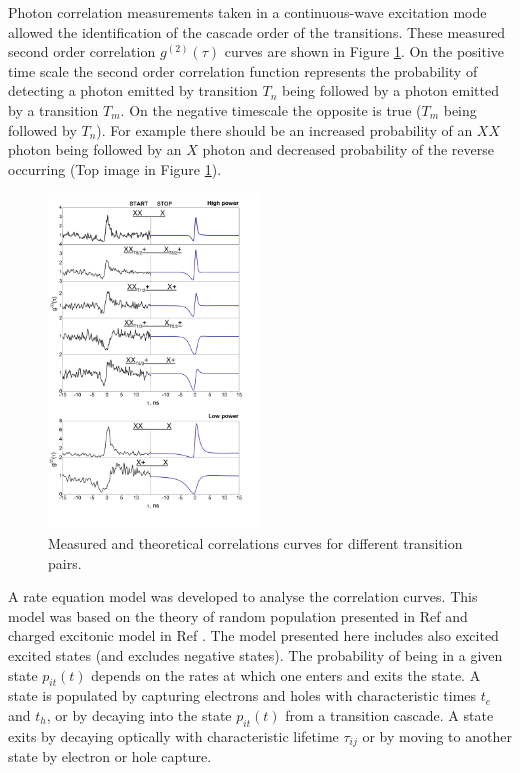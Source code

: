 \documentclass[12pt, twoside]{article}
\numberwithin{equation}{section}
\begin{document}
Photon correlation measurements taken in a continuous-wave excitation
mode allowed the identification of the cascade order of the transitions.
These measured second order correlation $g^{(2)}(\tau)$ curves are shown
in Figure \ref{fig:trioncorrs}. On the positive time scale the second
order correlation function represents the probability of detecting a
photon emitted by transition $T_n$ being followed by a photon emitted by
a transition $T_m$. On the negative timescale the opposite is true
($T_m$ being followed by $T_n$). For example there should be an
increased probability of an $XX$ photon being followed by an $X$ photon
and decreased probability of the reverse occurring (Top image in Figure
\ref{fig:trioncorrs}).

\begin{figure}[H]
    \centering
    \includegraphics[width=0.5\textwidth]{images/ABcoeff.png}
    \caption{Measured and theoretical correlations curves for different transition pairs. }
    \label{fig:trioncorrs}
\end{figure}

A rate equation model was developed to analyse the correlation curves.
This model was based on the theory of random population presented in Ref
\cite{grundmann} and charged excitonic model in Ref \cite{baiermodel}.
The model presented here includes also excited excited states (and
excludes negative states). The probability of being in a given state
$p_{it}(t)$ depends on the rates at which one enters and exits the
state. A state is populated by capturing electrons and holes with
characteristic times $t_e$ and $t_h$, or by decaying into the state
$p_{it}(t)$ from a transition cascade. A state exits by decaying
optically with characteristic lifetime $\tau_{ij}$ or by moving to
another state by electron or hole capture.
\end{document}
